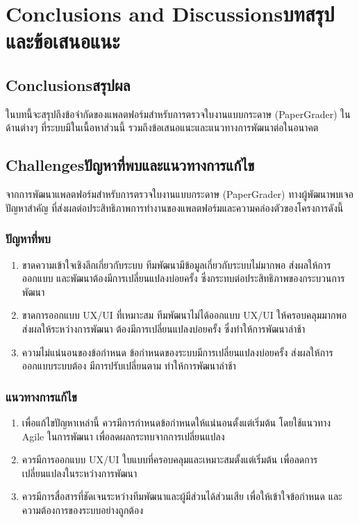 \chapter{\ifenglish Conclusions and Discussions\else บทสรุปและข้อเสนอแนะ\fi}

\section{\ifenglish Conclusions\else สรุปผล\fi}
  \qquad ในบทนี้จะสรุปถึงข้อจํากัดของแพลตฟอร์มสำหรับการตรวจใบงานแบบกระดาษ (PaperGrader)
  ในด้านต่างๆ ที่ระบบมีในเนื้อหาส่วนนี้ รวมถึงข้อเสนอแนะและแนวทางการพัฒนาต่อในอนาคต

\section{\ifenglish Challenges\else ปัญหาที่พบและแนวทางการแก้ไข\fi}
  \qquad จากการพัฒนาแพลตฟอร์มสำหรับการตรวจใบงานแบบกระดาษ (PaperGrader) ทางผู้พัฒนาพบเจอปัญหาสําคัญ
  ที่ส่งผลต่อประสิทธิภาพการทำงานของแพลตฟอร์มและความคล่องตัวของโครงการดังนี้
  \subsection{ปัญหาที่พบ}
    \begin{enumerate}
      \item ขาดความเข้าใจเชิงลึกเกี่ยวกับระบบ ทีมพัฒนามีข้อมูลเกี่ยวกับระบบไม่มากพอ ส่งผลให้การออกแบบ
      และพัฒนาต้องมีการเปลี่ยนแปลงบ่อยครั้ง ซึ่งกระทบต่อประสิทธิภาพของกระบวนการพัฒนา
      \item ขาดการออกแบบ UX/UI ที่เหมาะสม ทีมพัฒนาไม่ได้ออกแบบ UX/UI ให้ครอบคลุมมากพอ ส่งผลให้ระหว่างการพัฒนา
      ต้องมีการเปลี่ยนแปลงบ่อยครั้ง ซึ่งทําให้การพัฒนาล่าช้า
      \item ความไม่แน่นอนของข้อกําหนด ข้อกําหนดของระบบมีการเปลี่ยนแปลงบ่อยครั้ง ส่งผลให้การออกแบบระบบต้อง
      มีการปรับเปลี่ยนตาม ทําให้การพัฒนาล่าช้า
    \end{enumerate}
  \subsection{แนวทางการแก้ไข}
    \begin{enumerate}
      \item เพื่อแก้ไขปัญหาเหล่านี้ ควรมีการกําหนดข้อกําหนดให้แน่นอนตั้งแต่เริ่มต้น โดยใช้แนวทาง Agile ในการพัฒนา
      เพื่อลดผลกระทบจากการเปลี่ยนแปลง
      \item ควรมีการออกแบบ UX/UI ใบแบบที่ครอบคลุมและเหมาะสมตั้งแต่เริ่มต้น เพื่อลดการเปลี่ยนแปลงในระหว่างการพัฒนา
      \item ควรมีการสื่อสารที่ชัดเจนระหว่างทีมพัฒนาและผู้มีส่วนได้ส่วนเสีย เพื่อให้เข้าใจข้อกําหนด
      และความต้องการของระบบอย่างถูกต้อง
    \end{enumerate}

